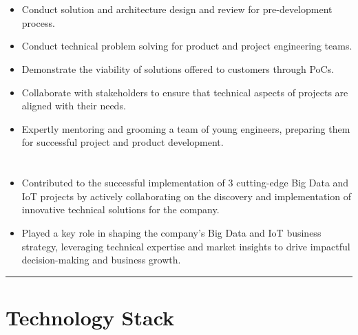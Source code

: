 \documentclass[12pt]{res}
\begin{document}
\begin{resume}
\begin{multicols}{2}
	\section{}
		\begin{itemize}
			\item Conduct solution and architecture design and review for pre-development process.
\item Conduct technical problem solving for product and project engineering teams.
\item Demonstrate the viability of solutions offered to customers through PoCs.
\item Collaborate with stakeholders to ensure that technical aspects of projects are aligned with their needs.
\item Expertly mentoring and grooming a team of young engineers, preparing them for successful project and product development.
		\end{itemize}
	\section{}
		\begin{itemize}
			\setlength{\itemindent}{0pt}
			\item Contributed to the successful implementation of 3 cutting-edge Big Data and IoT projects by actively collaborating on the discovery and implementation of innovative technical solutions for the company.
\item Played a key role in shaping the company's Big Data and IoT business strategy, leveraging technical expertise and market insights to drive impactful decision-making and business growth.
		\end{itemize}
\end{multicols}

\vspace{-20pt}
\begin{minipage}[t]{0.55\linewidth}
	\rule{0.25\textwidth}{2pt}
	\begin{multicols}{2}
		\section{Technology Stack}
		\columnbreak
		\section{}
	\end{multicols}
	\vspace{1pt}
\end{minipage}
\hfill
\begin{minipage}[t]{0.42\linewidth}
	\vspace{18pt}

\end{minipage}
\end{resume}
\end{document}
